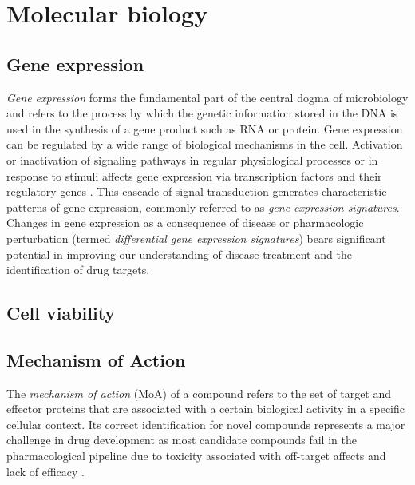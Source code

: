 \documentclass[bsc,frontabs,twoside,singlespacing,parskip,deptreport]{infthesis}     %
\begin{document}
\section{Molecular biology}
\subsection{Gene expression}
\textit{Gene expression} forms the fundamental part of the central dogma of microbiology \cite{crick_protein_1958} and refers to the process by which the genetic information stored in the DNA is used in the synthesis of a gene product such as RNA or protein. Gene expression can be regulated by a wide range of biological mechanisms in the cell. Activation or inactivation of signaling pathways in regular physiological processes or in response to stimuli affects gene expression via transcription factors and their regulatory genes \cite{itadani_can_2008}. This cascade of signal transduction generates characteristic patterns of gene expression, commonly referred to as \textit{gene expression signatures}.
Changes in gene expression as a consequence of disease or pharmacologic perturbation (termed \textit{differential gene expression signatures}) bears significant potential in improving our understanding of disease treatment and the identification of drug targets.
\subsection{Cell viability}
\subsection{Mechanism of Action}
The \textit{mechanism of action} (MoA) of a compound refers to the set of target and effector proteins that are associated with a certain biological activity in a specific cellular context. Its correct identification for novel compounds represents a major challenge in drug development as most candidate compounds fail in the pharmacological pipeline due to toxicity associated with off-target affects and lack of efficacy \cite{wehling_assessing_2009}.
\end{document}
